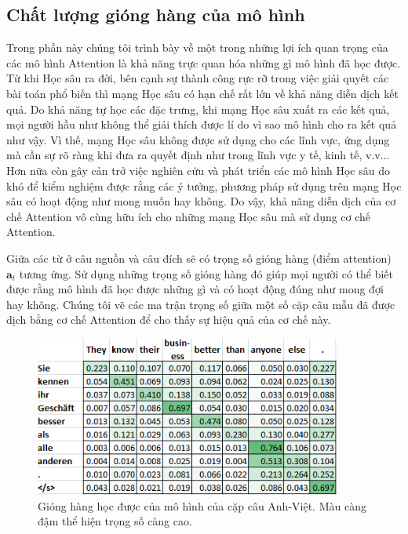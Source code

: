 \subsection{Chất lượng gióng hàng của mô hình}
Trong phần này chúng tôi trình bày về một trong những lợi ích quan trọng của các mô hình Attention là khả năng trực quan hóa những gì mô hình đã học được. Từ khi Học sâu ra đời, bên cạnh sự thành công rực rỡ trong việc giải quyết các bài toán phổ biến thì mạng Học sâu có hạn chế rất lớn về khả năng diễn dịch kết quả. Do khả năng tự học các đặc trưng, khi mạng Học sâu xuất ra các kết quả, mọi người hầu như không thể giải thích được lí do vì sao mô hình cho ra kết quả như vậy. Vì thế, mạng Học sâu không được sử dụng cho các lĩnh vực, ứng dụng mà cần sự rõ ràng khi đưa ra quyết định như trong lĩnh vực y tế, kinh tế, v.v... Hơn nữa còn gây cản trở việc nghiên cứu và phát triển các mô hình Học sâu do khó để kiểm nghiệm được rằng các ý tưởng, phương pháp sử dụng trên mạng Học sâu có hoạt động như mong muốn hay không. Do vậy, khả năng diễn dịch của cơ chế Attention vô cùng hữu ích cho những mạng Học sâu mà sử dụng cơ chế Attention.

Giữa các từ ở câu nguồn và câu đích sẽ có trọng số gióng hàng (điểm attention) $\bm{a}_t$ tương ứng. Sử dụng những trọng số gióng hàng đó giúp mọi người có thể biết được rằng mô hình đã học được những gì và có hoạt động đúng như mong đợi hay không. Chúng tôi vẽ các ma trận trọng số giữa một số cặp câu mẫu đã được dịch bằng cơ chế Attention để cho thấy sự hiệu quả của cơ chế này.

\begin{figure}
	\centering
	\includegraphics[width=0.9\textwidth]{en-de_attn-weights_31.png}
	\caption[Gióng hàng học được của mô hình của cặp câu Anh-Việt.]{Gióng hàng học được của mô hình của cặp câu Anh-Việt. Màu càng đậm thể hiện trọng số càng cao.}
	\label{fig_en-de_attn-weights_31}
\end{figure}

